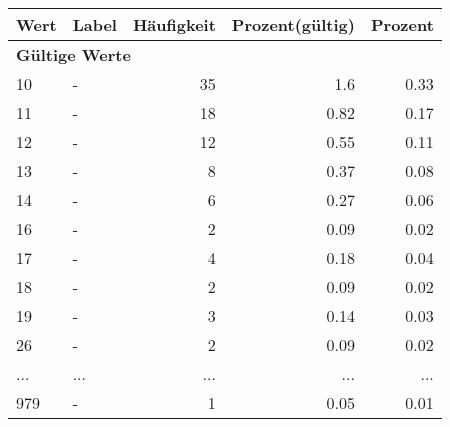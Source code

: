      \begin{longtable}{lXrrr}
     \toprule
     \textbf{Wert} & \textbf{Label} & \textbf{Häufigkeit} & \textbf{Prozent(gültig)} & \textbf{Prozent} \\
     \endhead
     \midrule
     \multicolumn{5}{l}{\textbf{Gültige Werte}}\\
        10 & \multicolumn{1}{X}{-} & %
          \num{35} &
          \num[round-mode=places,round-precision=2]{1,6} &
          \num[round-mode=places,round-precision=2]{0,33} \\
        11 & \multicolumn{1}{X}{-} & %
          \num{18} &
          \num[round-mode=places,round-precision=2]{0,82} &
          \num[round-mode=places,round-precision=2]{0,17} \\
        12 & \multicolumn{1}{X}{-} & %
          \num{12} &
          \num[round-mode=places,round-precision=2]{0,55} &
          \num[round-mode=places,round-precision=2]{0,11} \\
        13 & \multicolumn{1}{X}{-} & %
          \num{8} &
          \num[round-mode=places,round-precision=2]{0,37} &
          \num[round-mode=places,round-precision=2]{0,08} \\
        14 & \multicolumn{1}{X}{-} & %
          \num{6} &
          \num[round-mode=places,round-precision=2]{0,27} &
          \num[round-mode=places,round-precision=2]{0,06} \\
        16 & \multicolumn{1}{X}{-} & %
          \num{2} &
          \num[round-mode=places,round-precision=2]{0,09} &
          \num[round-mode=places,round-precision=2]{0,02} \\
        17 & \multicolumn{1}{X}{-} & %
          \num{4} &
          \num[round-mode=places,round-precision=2]{0,18} &
          \num[round-mode=places,round-precision=2]{0,04} \\
        18 & \multicolumn{1}{X}{-} & %
          \num{2} &
          \num[round-mode=places,round-precision=2]{0,09} &
          \num[round-mode=places,round-precision=2]{0,02} \\
        19 & \multicolumn{1}{X}{-} & %
          \num{3} &
          \num[round-mode=places,round-precision=2]{0,14} &
          \num[round-mode=places,round-precision=2]{0,03} \\
        26 & \multicolumn{1}{X}{-} & %
          \num{2} &
          \num[round-mode=places,round-precision=2]{0,09} &
          \num[round-mode=places,round-precision=2]{0,02} \\
       ... & ... & ... & ... & ... \\
        979 & \multicolumn{1}{X}{-} & %
          \num{1} &
          \num[round-mode=places,round-precision=2]{0,05} &
          \num[round-mode=places,round-precision=2]{0,01} \\


\end{longtable}
